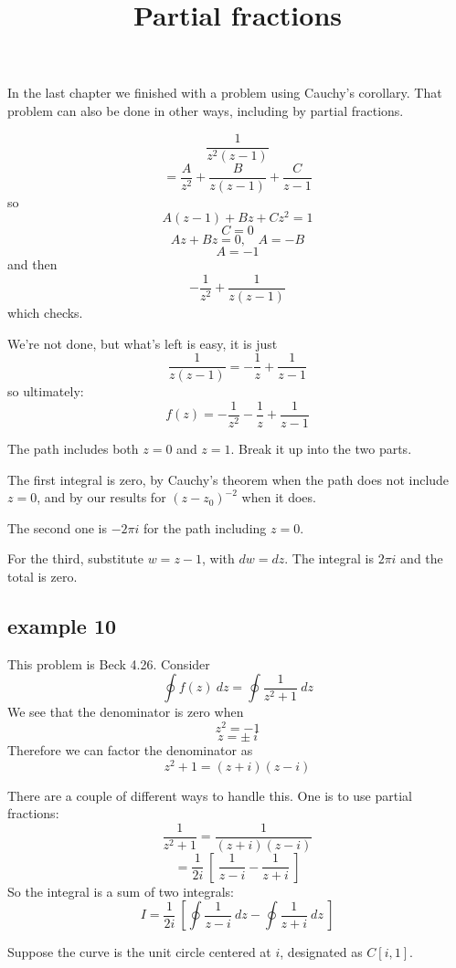 \documentclass[11pt, oneside]{article}
\title{Partial fractions}
\date{}
\begin{document}
\maketitle
\Large


In the last chapter we finished with a problem using Cauchy's corollary.  That problem can also be done in other ways, including by partial fractions.

\label{sec:ex8PF}

\[ \frac{1}{z^2(z - 1)} \]
\[ = \frac{A}{z^2} + \frac{B}{z(z-1)} + \frac{C}{z - 1} \]
so
\[ A(z-1) + Bz + Cz^2 = 1 \]
\[ C = 0 \]
\[ Az + Bz = 0, \ \ \ \ A = -B \]
\[ A = -1 \]
and then
\[ -\frac{1}{z^2} + \frac{1}{z(z - 1)} \]
which checks.

We're not done, but what's left is easy, it is just
\[ \frac{1}{z(z - 1)} = -\frac{1}{z} + \frac{1}{z - 1} \]
so ultimately:
\[ f(z) = -\frac{1}{z^2} -\frac{1}{z} + \frac{1}{z - 1} \]

The path includes both $z = 0$ and $z = 1$.  Break it up into the two parts.

The first integral is zero, by Cauchy's theorem when the path does not include $z = 0$, and by our results for $(z-z_0)^{-2}$ when it does.

The second one is $-2\pi i$ for the path including $z = 0$.

For the third, substitute $w = z - 1$, with $dw = dz$.  The integral is $2 \pi i$ and the total is zero.

\subsection*{example 10}

\label{sec:ex10PF}

This problem is Beck 4.26.  Consider 
\[ \oint f(z) \ dz = \oint \frac{1}{z^2 + 1} \ dz \]
We see that the denominator is zero when
\[ z^2 = -1 \]
\[ z = \pm \ i \]
Therefore we can factor the denominator as
\[ z^2 + 1 = (z + i) (z-i) \]

There are a couple of different ways to handle this.  One is to use partial fractions:
\[ \frac{1}{z^2 + 1} = \frac{1}{(z + i) (z-i)} \]
\[ = \frac{1}{2i} \ [ \ \frac{1}{z - i} - \frac{1}{z+i} \ ] \]
So the integral is a sum of two integrals:
\[ I = \frac{1}{2i} \ [ \oint \frac{1}{z - i}  \ dz -  \oint \frac{1}{z + i} \ dz \ ] \] 

Suppose the curve is the unit circle centered at $i$, designated as $C[i,1]$.  
\end{document}
